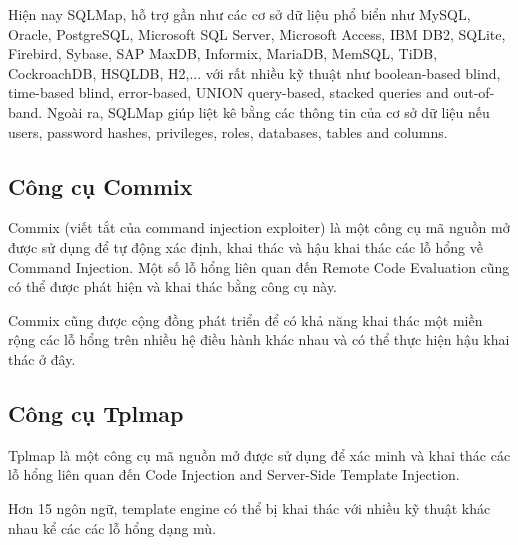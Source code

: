 \documentclass[./../main.tex]{subfiles}
\begin{document}
Hiện nay SQLMap, hỗ trợ gần như các cơ sở dữ liệu phổ biển như MySQL,
Oracle, PostgreSQL, Microsoft SQL Server, Microsoft Access, IBM DB2,
SQLite, Firebird, Sybase, SAP MaxDB, Informix, MariaDB, MemSQL, TiDB,
CockroachDB, HSQLDB, H2,... với rất nhiều kỹ thuật như boolean-based blind,
time-based blind, error-based, UNION query-based, stacked queries and
out-of-band. Ngoài ra, SQLMap giúp liệt kê bằng các thông tin của cơ
sở dữ liệu nếu users, password hashes, privileges, roles, databases,
tables and columns.

\subsection{Công cụ Commix}
Commix (viết tắt của command injection exploiter) là một công cụ mã nguồn
mở được sử dụng để tự động xác định, khai thác và hậu khai thác các lỗ
hổng về Command Injection. Một số lỗ hổng liên quan đến
Remote Code Evaluation cũng có thể được phát hiện và khai thác bằng công
cụ này.

Commix cũng được cộng đồng phát triển để có khả năng khai
thác một miền rộng các lỗ hổng trên nhiều hệ điều hành khác nhau
và có thể thực hiện hậu khai thác ở đây.
\subsection{Công cụ Tplmap}
Tplmap là một công cụ mã nguồn mở được sử dụng để xác minh và khai
thác các lỗ hổng liên quan đến Code Injection and Server-Side Template
Injection.


Hơn 15 ngôn ngữ, template engine có thể bị khai thác với nhiều kỹ thuật
khác nhau kể các các lỗ hổng dạng mù.
\end{document}
